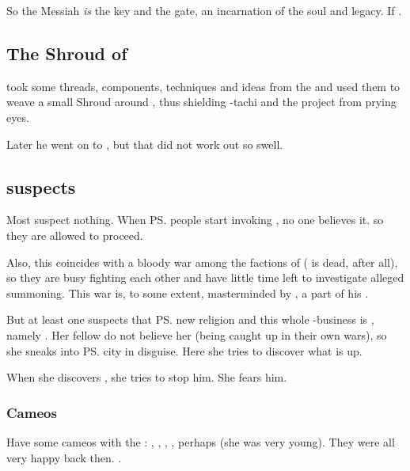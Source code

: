 So the Messiah \emph{is} the key and the gate, an incarnation of the \bane{} soul and legacy. If .









\subsection{The Shroud of \Numah}
\Daggerrain{} took some threads, components, techniques and ideas from the  and used them to weave a small Shroud around \Numah, thus shielding \Semiza-tachi and the \resphan{} project from prying \draconian{} eyes. 

Later he went on to , but that did not work out so swell.









\subsection{\Vexstrasshin{} suspects}
Most \dragons{} suspect nothing. 
When \ps{\Semiza}{} people start invoking \banes{}, no one believes it. so they are allowed to proceed. 

Also, this coincides with a bloody war among the factions of \dragons{} (\Tiamat{} is dead, after all), so they are busy fighting each other and have little time left to investigate alleged \bane{} summoning. 
This war is, to some extent, masterminded by \Daggerrain, a part of his . 

But at least one \dragon{} suspects that \ps{\Semiza} new religion and this whole \Thanatzil-business is , namely . 
Her fellow \dragons{} do not believe her (being caught up in their own wars), so she sneaks into \ps{\Semiza} city in disguise. 
Here she tries to discover what is up. 

When she discovers \Thanatzil, she tries to stop him. 
She fears him. 





\subsubsection{Cameos}
Have some cameos with the \dragons{}: 
\Nexagglachel, \Ishnaruchaefir, \Secherdamon, \Triestessakhin, perhaps \Nzessuacrith{} (she was very young). 
They were all very happy back then. 
. 









